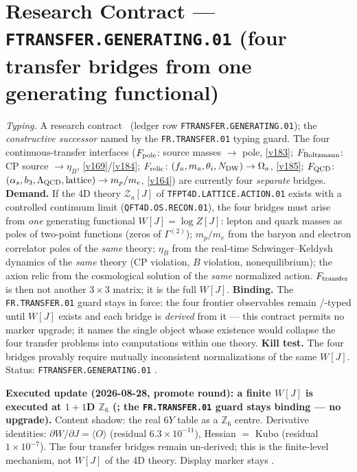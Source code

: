 \documentclass[11pt,a4paper]{article}
\begin{document}
\section*{Research Contract --- \texttt{FTRANSFER.GENERATING.01} (four transfer bridges from one generating functional)}
\noindent\emph{Typing.} A research contract \mO\ (ledger row \texttt{FTRANSFER.GENERATING.01});
the \emph{constructive successor} named by the \texttt{FR.TRANSFER.01} typing guard.  The four
continuous-transfer interfaces ($F_{\rm pole}$: source masses $\to$ pole, \vref{v183};
$F_{\rm Boltzmann}$: CP source $\to\eta_B$, \vref{v169}/\vref{v184}; $F_{\rm relic}$:
$(f_a,m_a,\theta_i,N_{\rm DW})\to\Omega_a$, \vref{v185}; $F_{\rm QCD}$:
$(\alpha_s,b_3,\Lambda_{\rm QCD},\text{lattice})\to m_p/m_e$, \vref{v164}) are currently four
\emph{separate} bridges.  \textbf{Demand.}  If the 4D theory $\mathcal Z_a[J]$ of
\texttt{TFPT4D.LATTICE.ACTION.01} exists with a controlled continuum limit
(\texttt{QFT4D.OS.RECON.01}), the four bridges must arise from \emph{one} generating functional
$W[J]=\log Z[J]$: lepton and quark masses as poles of two-point functions (zeros of
$\Gamma^{(2)}$); $m_p/m_e$ from the baryon and electron correlator poles of the \emph{same}
theory; $\eta_B$ from the real-time Schwinger--Keldysh dynamics of the \emph{same} theory (CP
violation, $B$ violation, nonequilibrium); the axion relic from the cosmological solution of
the \emph{same} normalized action.  $F_{\rm transfer}$ is then not another $3\times3$ matrix;
it is the full $W[J]$.  \textbf{Binding.}  The \texttt{FR.TRANSFER.01} guard stays in force:
the four frontier observables remain \mC/\mO-typed until $W[J]$ exists and each bridge is
\emph{derived} from it --- this contract permits no marker upgrade; it names the single object
whose existence would collapse the four transfer problems into computations within one theory.
\textbf{Kill test.}  The four bridges provably require mutually inconsistent normalizations of
the same $W[J]$.  Status: \texttt{FTRANSFER.GENERATING.01} \mO.

\par\smallskip\noindent\textbf{Executed update (2026-08-28, promote round): a finite $W[J]$ is
executed at $1{+}1$D $\mathbb Z_6$
(; the
\texttt{FR.TRANSFER.01} guard stays binding --- no upgrade).}
Content shadow: the real $6Y$ table as a $\mathbb Z_6$ centre.  Derivative identities:
$\partial W/\partial J=\langle O\rangle$ (residual $6.3\times10^{-11}$), Hessian $=$ Kubo
(residual $1\times10^{-7}$).  The four transfer bridges remain un-derived; this is the
finite-level mechanism, not $W[J]$ of the 4D theory.  Display marker stays \mO.
\end{document}
